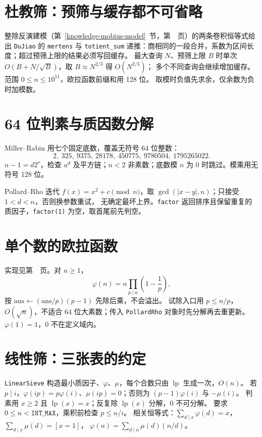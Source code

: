 \section{杜教筛：预筛与缓存都不可省略}\label{knowledge-dujiao}
整除反演建模（第~\ref{knowledge-mobius-model}~节，第~\pageref{knowledge-mobius-model}~页）的两条卷积恒等式给出 \texttt{DuJiao} 的
\texttt{mertens} 与 \texttt{totient\_sum} 递推：商相同的一段合并，系数为区间长度；超过预筛上限的结果必须写回缓存。
最大查询 $N$、预筛上限 $B$ 时单次 $O(B+N/\sqrt B)$，取 $B\approx N^{2/3}$ 得 $O(N^{2/3})$；
多个不同查询会继续增加缓存。范围 $0\le n\le10^{11}$，欧拉函数前缀和用 128 位。
取模时负值先求余，仅余数为负时加模数。

\section{64 位判素与质因数分解}\label{knowledge-miller-bounds}
Miller--Rabin 用七个固定底数，覆盖无符号 64 位整数：
\[
2,\ 325,\ 9375,\ 28178,\ 450775,\ 9780504,\ 1795265022.
\]
$n-1=d2^s$，检查 $a^d$ 及平方链；$n<2$ 非素数；底数模 $n$ 为 0 时跳过。模乘用无符号 128 位。

Pollard--Rho 迭代 $f(x)=x^2+c\pmod n$，取 $\gcd(|x-y|,n)$；只接受 $1<d<n$，否则换参数重试，
无确定最坏上界。\texttt{factor} 返回排序且保留重复的质因子，\texttt{factor(1)} 为空，取首尾前先判空。

\section{单个数的欧拉函数}\label{knowledge-phi-single}
实现见第~\pageref{compact-euler_phi}~页。对 $n\ge1$，
\[
\varphi(n)=n\prod_{p\mid n}\left(1-\frac1p\right),
\]
按 $\mathrm{ans}\gets(\mathrm{ans}/p)(p-1)$ 先除后乘，不会溢出。
试除入口用 $p\le n/p$，$O(\sqrt n)$，不适合 64 位大素数；传入 \texttt{PollardRho} 对象时先分解再去重更新。
$\varphi(1)=1$，0 不在定义域内。

\section{线性筛：三张表的约定}\label{knowledge-linear-sieve}
\texttt{LinearSieve} 构造最小质因子、$\varphi$、$\mu$，每个合数只由 $\operatorname{lp}$ 生成一次，$O(n)$。
若 $p\mid i$，$\varphi(ip)=p\varphi(i)$、$\mu(ip)=0$；否则为 $(p-1)\varphi(i)$ 与 $-\mu(i)$。
判素用 $x\ge2$ 且 $\operatorname{lp}(x)=x$；反复除 $\operatorname{lp}(x)$ 分解，0 不可分解。
要求 $0\le n<\texttt{INT\_MAX}$，乘积前检查 $p\le n/i$。
相关恒等式：$\sum_{d\mid x}\varphi(d)=x$，$\sum_{d\mid x}\mu(d)=[x=1]$，
$\varphi(n)=\sum_{d\mid n}\mu(d)(n/d)$。


